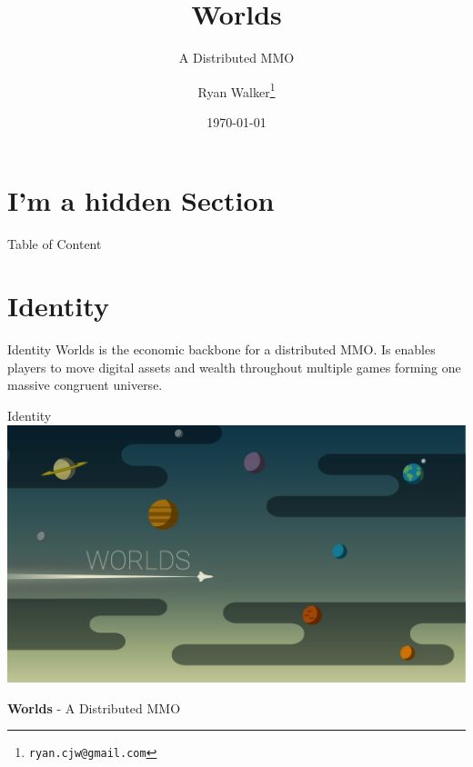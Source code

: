 \documentclass[final, ngerman, xcolor=pdftex, dvipsnames, table, aspectratio=169, 14pt]{beamer}
\begin{document}
\title[Worlds]{Worlds}
\subtitle[]{A Distributed MMO}
\author[]{Ryan Walker\footnote{\texttt{ryan.cjw@gmail.com}}}
\date{\today} %


\begin{frame}
  \maketitle
\end{frame}

\section*{I'm a hidden Section}
\begin{frame}{Table of Content} %
    \tableofcontents
\end{frame}

\section{Identity}

\begin{frame}{Identity}
Worlds is the economic backbone for a distributed MMO. Is enables players to move digital assets and wealth throughout multiple games forming one massive congruent universe. 
\end{frame}

\begin{frame}{Identity}
\centering
\includegraphics[scale=0.15]{Header.png} 

\textbf{Worlds} - A Distributed MMO
\end{frame}
\end{document}

